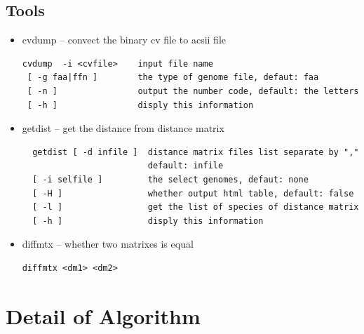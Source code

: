 \documentclass[a4paper,12pt]{article}
\begin{document}
\subsection{Tools}
\begin{itemize}
	\item cvdump -- convect the binary cv file to acsii file
	\begin{verbatim}
cvdump  -i <cvfile>    input file name
 [ -g faa|ffn ]        the type of genome file, defaut: faa
 [ -n ]                output the number code, default: the letters
 [ -h ]                disply this information
\end{verbatim}

	\item getdist -- get the distance from distance matrix
	\begin{verbatim}
  getdist [ -d infile ]  distance matrix files list separate by ","
                         default: infile
  [ -i selfile ]         the select genomes, defaut: none
  [ -H ]                 whether output html table, default: false
  [ -l ]                 get the list of species of distance matrix
  [ -h ]                 disply this information
\end{verbatim}

\item diffmtx -- whether two matrixes is equal
\begin{verbatim}
diffmtx <dm1> <dm2>
\end{verbatim}
\end{itemize}

\section{Detail of Algorithm}
\end{document}

